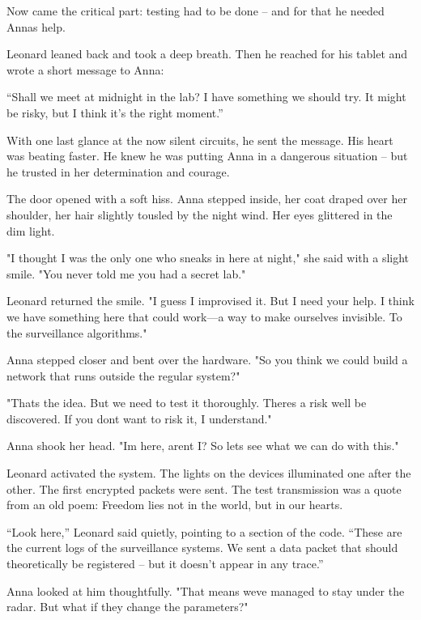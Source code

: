 \documentclass[
]{article}
\begin{document}
Now came the critical part: testing had to be done -- and for that he needed Anna\textquotesingle s help.

Leonard leaned back and took a deep breath. Then he reached for his tablet and wrote a short message to Anna:

``Shall we meet at midnight in the lab? I have something we should try. It might be risky, but I think it's the right moment.''

With one last glance at the now silent circuits, he sent the message. His heart was beating faster. He knew he was putting Anna in a dangerous situation -- but he trusted in her determination and courage.

The door opened with a soft hiss. Anna stepped inside, her coat draped over her shoulder, her hair slightly tousled by the night wind. Her eyes glittered in the dim light.

"I thought I was the only one who sneaks in here at night," she said with a slight smile. "You never told me you had a secret lab."

Leonard returned the smile. "I guess I improvised it. But I need your help. I think we have something here that could work---a way to make ourselves invisible. To the surveillance algorithms."

Anna stepped closer and bent over the hardware. "So you think we could build a network that runs outside the regular system?"

"That\textquotesingle s the idea. But we need to test it thoroughly. There\textquotesingle s a risk we\textquotesingle ll be discovered. If you don\textquotesingle t want to risk it, I understand."

Anna shook her head. "I\textquotesingle m here, aren\textquotesingle t I? So let\textquotesingle s see what we can do with this."

Leonard activated the system. The lights on the devices illuminated one after the other. The first encrypted packets were sent. The test transmission was a quote from an old poem: Freedom lies not in the world, but in our hearts.

``Look here,'' Leonard said quietly, pointing to a section of the code. ``These are the current logs of the surveillance systems. We sent a data packet that should theoretically be registered -- but it doesn't appear in any trace.''

Anna looked at him thoughtfully. "That means we\textquotesingle ve managed to stay under the radar. But what if they change the parameters?"
\end{document}
